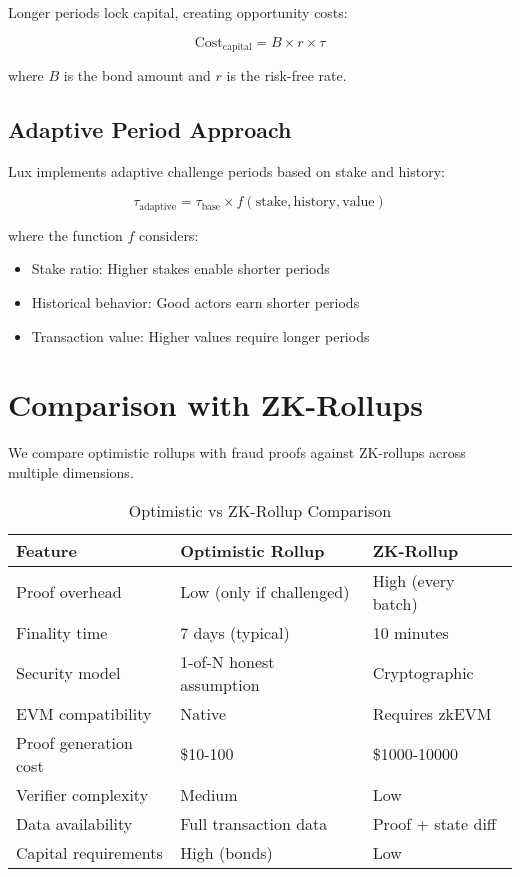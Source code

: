 \documentclass[11pt,a4paper]{article}
\theoremstyle{definition}
\begin{document}
Longer periods lock capital, creating opportunity costs:

\begin{equation}
\text{Cost}_{\text{capital}} = B \times r \times \tau
\end{equation}

where $B$ is the bond amount and $r$ is the risk-free rate.

\subsection{Adaptive Period Approach}

Lux implements adaptive challenge periods based on stake and history:

\begin{equation}
\tau_{\text{adaptive}} = \tau_{\text{base}} \times f(\text{stake}, \text{history}, \text{value})
\end{equation}

where the function $f$ considers:
\begin{itemize}
    \item Stake ratio: Higher stakes enable shorter periods
    \item Historical behavior: Good actors earn shorter periods
    \item Transaction value: Higher values require longer periods
\end{itemize}

\section{Comparison with ZK-Rollups}

We compare optimistic rollups with fraud proofs against ZK-rollups across multiple dimensions.

\begin{table}[h]
\centering
\caption{Optimistic vs ZK-Rollup Comparison}
\begin{tabular}{lll}
\toprule
\textbf{Feature} & \textbf{Optimistic Rollup} & \textbf{ZK-Rollup} \\
\midrule
Proof overhead & Low (only if challenged) & High (every batch) \\
Finality time & 7 days (typical) & 10 minutes \\
Security model & 1-of-N honest assumption & Cryptographic \\
EVM compatibility & Native & Requires zkEVM \\
Proof generation cost & \$10-100 & \$1000-10000 \\
Verifier complexity & Medium & Low \\
Data availability & Full transaction data & Proof + state diff \\
Capital requirements & High (bonds) & Low \\
\bottomrule
\end{tabular}
\end{table}
\end{document}
